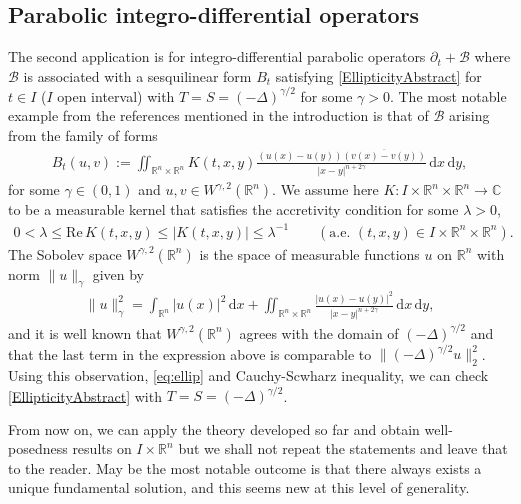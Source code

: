 \documentclass[11pt, letterpaper]{amsart}
\theoremstyle{definition}
\theoremstyle{remark}
\numberwithin{equation}{section}
\begin{document}
\subsection{Parabolic integro-differential operators}
The second application is for integro-differential parabolic  operators $\partial_t+ \mathcal{B}$
where  $\mathcal{B}$ is associated with a sesquilinear form  $B_t$
satisfying  \eqref{EllipticityAbstract} for $t\in I$ ($I$ open interval) with $T=S=(-\Delta)^{\gamma/2}$ for some $\gamma>0$. 
The most notable example from the references mentioned in the introduction is that of  $\mathcal{B}$ arising from the family of forms
\begin{align*}
 B_t(u,v) := \iint_{\mathbb{R}^n \times \mathbb{R}^n} K(t,x,y) \frac{(u(x) - u(y)) \overline{(v(x)-v(y))}}{|x-y|^{n+2\gamma}} \, \mathrm{d} x \, \mathrm{d} y,
\end{align*}
for some $\gamma \in (0,1)$ and
 $u,v \in W^{\gamma,2}(\mathbb{R}^n)$. We assume here $K: I\times \mathbb{R}^n \times \mathbb{R}^n \to \mathbb{C}$  to be a measurable kernel that satisfies the accretivity condition for some $\lambda>0$, 
 \begin{align}
\label{eq:ellip}
0<\lambda \leq \mathrm{Re}\,  K(t,x,y) \leq |K(t,x,y)| \leq \lambda^{-1} \qquad (\text{a.e. }(t,x,y) \in I \times \mathbb{R}^n \times \mathbb{R}^n). 
\end{align}
The Sobolev space $W^{\gamma,2}(\mathbb{R}^n)$ is the space of measurable functions $u$ on $\mathbb{R}^n$ with norm $\|u\|_\gamma$ given by 
 \begin{align*}
  \|u\|_\gamma^2=   \int_{\mathbb{R}^n} |u(x)|^2\, \mathrm{d}x + \iint_{\mathbb{R}^n \times \mathbb{R}^n} \frac{|u(x) - u(y)|^2}{|x-y|^{n+2\gamma}} \, \mathrm{d} x \, \mathrm{d} y,
 \end{align*}
 and it is well known that $W^{\gamma,2}(\mathbb{R}^n)$ agrees with the domain of $(-\Delta)^{\gamma/2}$ and that the last term in the expression above is comparable to $\|(-\Delta)^{\gamma/2}u\|_2^2$. Using this observation,   \eqref{eq:ellip} and Cauchy-Scwharz inequality, we can check \eqref{EllipticityAbstract} with $T=S=(-\Delta)^{\gamma/2}$. 
 
From now on, we can apply the theory developed so far and obtain well-posedness results on $I\times \mathbb{R}^n$ but we shall not repeat the statements and leave that to the reader. 
May be the most notable outcome is that there always exists a unique fundamental solution, and this seems new at this level of generality. 
\end{document}
